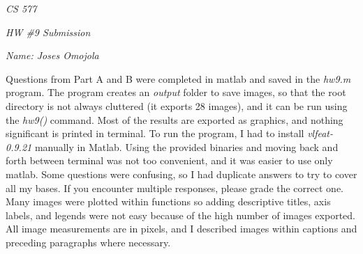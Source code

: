 \documentclass[12pt]{report}
\begin{document}
\centerline{\it CS 577}
\centerline{\it HW \#9 Submission}
\centerline{\it Name: Joses Omojola}

Questions from Part A and B were completed in matlab and saved in the \emph{hw9.m} program. The program creates an \emph{output} folder to save images, so that the 
root directory is not always cluttered (it exports 28 images), and it can be run using the \textit{hw9()} command. Most of the results are exported as graphics, and 
nothing significant is printed in terminal. To run the program, I had to install \emph{vlfeat-0.9.21} manually in Matlab. Using the provided binaries and moving back and forth 
between terminal was not too convenient, and it was easier to use only matlab. Some questions were confusing, so I had duplicate answers to try to cover all 
my bases. If you encounter multiple responses, please grade the correct one.  Many images were plotted within functions so adding descriptive titles, axis labels, and 
legends were not easy because of the high number of images exported. All image measurements are in pixels, and I described images within captions and preceding paragraphs
where necessary.
\end{document}
